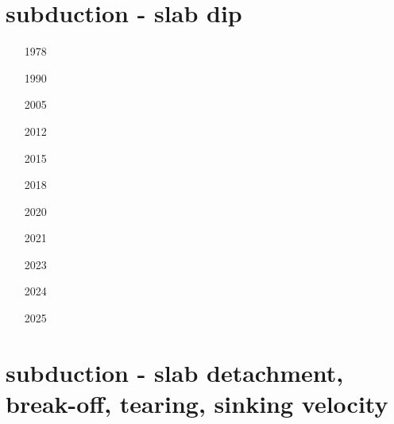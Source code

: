 \section{subduction - slab dip}

\begin{small}
\begin{itemize}
\item[1978] 
\item[1990] 
\item[2005] 
\item[2012] 
\item[2015] 
\item[2018] 
\item[2020] 
\item[2021]  \\ 
\item[2023] 
\item[2024] 
\item[2025] 
\end{itemize}
\end{small}


\section{subduction - slab detachment, break-off, tearing, sinking velocity}


